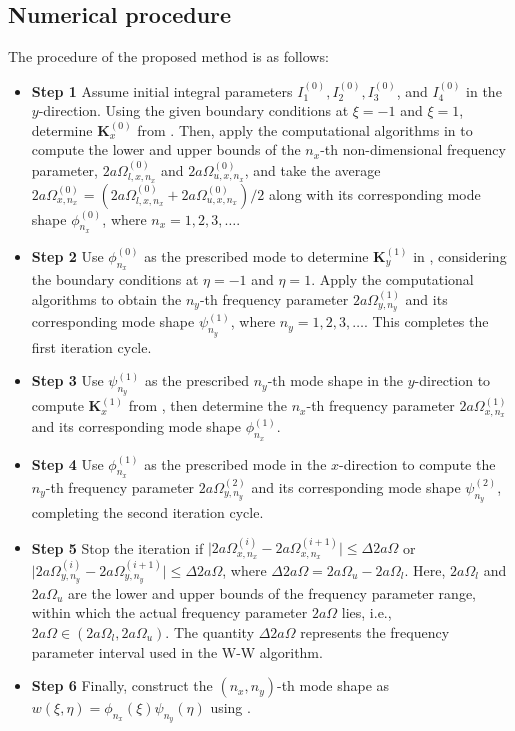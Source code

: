 \documentclass[preprint,12pt,number]{elsarticle}
\providecommand{\DIFaddtex}[1]{{\protect\color{blue}\uwave{#1}}} %
\providecommand{\DIFdeltex}[1]{{\protect\color{red}\sout{#1}}}                      %
\providecommand{\DIFaddbegin}{} %
\providecommand{\DIFaddend}{} %
\providecommand{\DIFdelbegin}{} %
\providecommand{\DIFdelend}{} %
\providecommand{\DIFadd}[1]{\texorpdfstring{\DIFaddtex{#1}}{#1}} %
\providecommand{\DIFdel}[1]{\texorpdfstring{\DIFdeltex{#1}}{}} %
\newcommand{\DIFscaledelfig}{0.5}
\newlength{\DIFdelgraphicswidth} %
\newlength{\DIFdelgraphicsheight} %
\newcommand{\DIFaddincludegraphics}[2][]{{\color{blue}\fbox{\DIFOincludegraphics[#1]{#2}}}} %
\newcommand{\DIFdelincludegraphics}[2][]{%
\sbox{\DIFdelgraphicsbox}{\DIFOincludegraphics[#1]{#2}}%
\settoboxwidth{\DIFdelgraphicswidth}{\DIFdelgraphicsbox} %
\settoboxtotalheight{\DIFdelgraphicsheight}{\DIFdelgraphicsbox} %
\scalebox{\DIFscaledelfig}{%
\parbox[b]{\DIFdelgraphicswidth}{\usebox{\DIFdelgraphicsbox}\\[-\baselineskip] \rule{\DIFdelgraphicswidth}{0em}}\llap{\resizebox{\DIFdelgraphicswidth}{\DIFdelgraphicsheight}{%
\setlength{\unitlength}{\DIFdelgraphicswidth}%
\begin{picture}(1,1)%
\thicklines\linethickness{2pt} %
{\color[rgb]{1,0,0}\put(0,0){\framebox(1,1){}}}%
{\color[rgb]{1,0,0}\put(0,0){\line( 1,1){1}}}%
{\color[rgb]{1,0,0}\put(0,1){\line(1,-1){1}}}%
\end{picture}%
}\hspace*{3pt}}} %
} %
\DeclareRobustCommand{\DIFaddbegin}{\DIFOaddbegin \let\includegraphics\DIFaddincludegraphics} %
\DeclareRobustCommand{\DIFaddend}{\DIFOaddend \let\includegraphics\DIFOincludegraphics} %
\DeclareRobustCommand{\DIFdelbegin}{\DIFOdelbegin \let\includegraphics\DIFdelincludegraphics} %
\DeclareRobustCommand{\DIFdelend}{\DIFOaddend \let\includegraphics\DIFOincludegraphics} %
\begin{document}
\subsection{Numerical procedure}\label{sec:Application procedure}
The procedure of the proposed method is as follows:   
\begin{itemize}[]
\item \textbf{Step 1} Assume initial integral parameters $I^{(0)}_1, I^{(0)}_2, I^{(0)}_3$, and $I^{(0)}_4$ in the $y$-direction. Using the given boundary conditions at $\xi = -1$ and $\xi = 1$, determine $\mathbf{K}^{(0)}_x$ from . 
Then, apply the computational algorithms in  to compute the lower and upper bounds of the $n_x$-th non-dimensional frequency parameter, $2a\Omega^{(0)}_{l,x,n_x}$ and $2a\Omega^{(0)}_{u,x,n_x}$, and take the average $2a\Omega^{(0)}_{x,n_x} = (2a\Omega^{(0)}_{l,x,n_x} + 2a\Omega^{(0)}_{u,x,n_x})/2$ along with its corresponding mode shape $\phi^{(0)}_{n_x}$, where $n_x = 1, 2, 3, \ldots$.

\item \textbf{Step 2} Use $\phi^{(0)}_{n_x}$ as the prescribed mode to determine $\mathbf{K}^{(1)}_y$ in , considering the boundary conditions at $\eta = -1$ and $\eta = 1$. 
Apply the computational algorithms to obtain the $n_y$-th frequency parameter $2a\Omega^{(1)}_{y,n_y}$ and its corresponding mode shape $\psi^{(1)}_{n_y}$, where $n_y = 1, 2, 3, \ldots$. This completes the first iteration cycle.  

\item \textbf{Step 3} Use $\psi^{(1)}_{n_y}$ as the prescribed $n_y$-th mode shape in the $y$-direction to compute $\mathbf{K}^{(1)}_x$ from , then determine the $n_x$-th frequency parameter $2a\Omega^{(1)}_{x,n_x}$ and its corresponding mode shape $\phi^{(1)}_{n_x}$.  

\item \textbf{Step 4} Use $\phi^{(1)}_{n_x}$ as the prescribed mode in the $x$-direction to compute the $n_y$-th frequency parameter $2a\Omega^{(2)}_{y,n_y}$ and its corresponding mode shape $\psi^{(2)}_{n_y}$, completing the second iteration cycle.  

\item \textbf{Step 5} Stop the iteration if $\lvert 2a\Omega^{(i)}_{x,n_x} - 2a\Omega^{(i+1)}_{x,n_x} \rvert \leq \Delta 2a\Omega$ or $\lvert 2a\Omega^{(i)}_{y,n_y} - 2a\Omega^{(i+1)}_{y,n_y} \rvert \leq \Delta 2a\Omega$, where $\Delta 2a\Omega = 2a\Omega_u - 2a\Omega_l$. Here, $2a\Omega_l$ and $2a\Omega_u$ are the lower and upper bounds of the frequency parameter range, within which the actual frequency parameter $2a\Omega$ lies, i.e., $2a\Omega \in (2a\Omega_l, 2a\Omega_u)$. The quantity $\Delta 2a\Omega$ represents the frequency parameter interval used in the W-W algorithm.

\item \textbf{Step 6} Finally, construct the $(n_x, n_y)$-th mode shape as \DIFdelbegin \DIFdel{$w(\xi, \eta) = \phi_{n_x}(\xi) \psi_{n_y}(\eta)$ }\DIFdelend \DIFaddbegin \DIFadd{$W(\xi, \eta) = \phi_{n_x}(\xi) \psi_{n_y}(\eta)$ }\DIFaddend using .  
\end{itemize}
\end{document}
